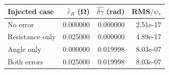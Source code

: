 \begin{tabular}{lrrr}
\toprule
Injected case & $\hat\varepsilon_R$ (\si{\ohm}) & $\widehat{\delta\gamma}$ (rad) & RMS$/\psi_*$\\
\midrule
No error & 0.000000 & 0.000000 & 2.51e-17 \\
Resistance only & 0.025000 & 0.000000 & 4.89e-17 \\
Angle only & 0.000000 & 0.019998 & 8.03e-07 \\
Both errors & 0.025000 & 0.019998 & 8.03e-07 \\
\bottomrule
\end{tabular}
